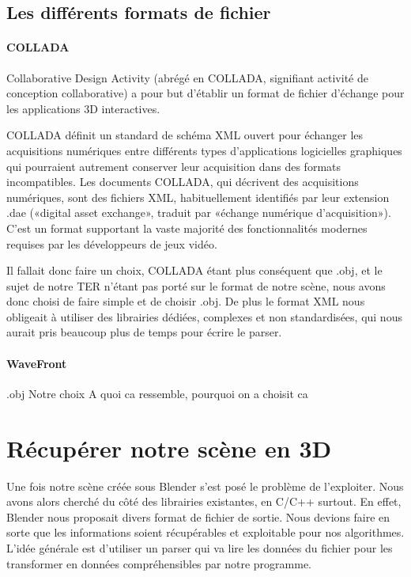 \documentclass[a4paper,12pt]{report}
\begin{document}
\subsection{Les différents formats de fichier}

\paragraph{COLLADA}

Collaborative Design Activity (abrégé en COLLADA, signifiant activité de conception collaborative) a pour but d'établir un format de fichier d'échange pour les applications 3D interactives.

COLLADA définit un standard de schéma XML ouvert pour échanger les acquisitions numériques entre différents types d'applications logicielles graphiques qui pourraient autrement conserver leur acquisition dans des formats incompatibles. Les documents COLLADA, qui décrivent des acquisitions numériques, sont des fichiers XML, habituellement identifiés par leur extension .dae («digital asset exchange», traduit par «échange numérique d'acquisition»).
C'est un format supportant la vaste majorité des fonctionnalités modernes
requises par les développeurs de jeux vidéo. 

Il fallait donc faire un choix, COLLADA étant plus conséquent que .obj, et le sujet de notre TER n'étant pas porté sur le format de notre scène, 
nous avons donc choisi de faire simple et de choisir .obj. De plus le format XML nous obligeait à utiliser des librairies dédiées, complexes et non standardisées, qui nous aurait pris beaucoup plus de temps pour écrire le parser.

\paragraph{WaveFront}

.obj
Notre choix
A quoi ca ressemble, pourquoi on a choisit ca

\section{Récupérer notre scène en 3D}
 
Une fois notre scène créée sous Blender s'est posé le problème de l'exploiter. Nous avons alors cherché du côté des librairies existantes, en C/C++ surtout. En effet, Blender nous proposait divers format de fichier de sortie. Nous devions faire en sorte que les informations soient récupérables et exploitable pour nos algorithmes. L'idée générale est d'utiliser un parser qui va lire les données du fichier pour les transformer en données compréhensibles par notre programme.
\end{document}
